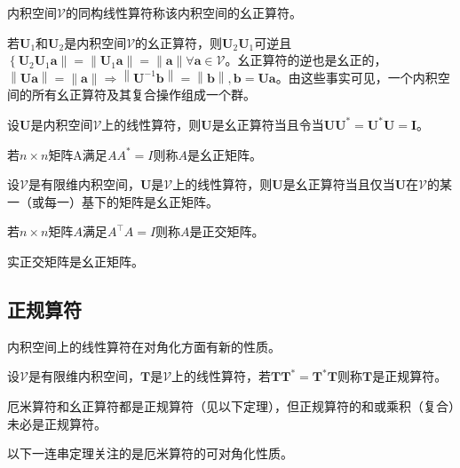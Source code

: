 \documentclass[main.tex]{subfiles}
\begin{document}
\begin{definition}[幺正算符]
内积空间$\mathcal{V}$的同构线性算符称该内积空间的幺正算符。
\end{definition}

若$\mathbf{U}_1$和$\mathbf{U}_2$是内积空间$\mathcal{V}$的幺正算符，则$\mathbf{U}_2\mathbf{U}_1$可逆且$\left\{\mathbf{U}_2\mathbf{U}_1\mathbf{a}\right\|=\left\|\mathbf{U}_1\mathbf{a}\right\|=\left\|\mathbf{a}\right\|\forall\mathbf{a}\in\mathcal{V}$。幺正算符的逆也是幺正的，$\left\|\mathbf{Ua}\right\|=\left\|\mathbf{a}\right\|\Rightarrow\left\|\mathbf{U}^{-1}\mathbf{b}\right\|=\left\|\mathbf{b}\right\|,\mathbf{b}=\mathbf{Ua}$。由这些事实可见，一个内积空间的所有幺正算符及其复合操作组成一个群。

\begin{theorem}
设$\mathbf{U}$是内积空间$\mathcal{V}$上的线性算符，则$\mathbf{U}$是幺正算符当且令当$\mathbf{UU}^*=\mathbf{U}^*\mathbf{U}=\mathbf{I}$。
\end{theorem}

\begin{definition}[幺正矩阵]
若$n\times n$矩阵A满足$AA^*=I$则称$A$是幺正矩阵。
\end{definition}

\begin{theorem}
设$\mathcal{V}$是有限维内积空间，$\mathbf{U}$是$\mathcal{V}$上的线性算符，则$\mathbf{U}$是幺正算符当且仅当$\mathbf{U}$在$\mathcal{V}$的某一（或每一）基下的矩阵是幺正矩阵。
\end{theorem}

\begin{definition}[正交矩阵]
若$n\times n$矩阵$A$满足$A^\intercal A=I$则称$A$是正交矩阵。
\end{definition}

实正交矩阵是幺正矩阵。

\subsection{正规算符}
内积空间上的线性算符在对角化方面有新的性质。

\begin{definition}[正规算符]
设$\mathcal{V}$是有限维内积空间，$\mathbf{T}$是$\mathcal{V}$上的线性算符，若$\mathbf{TT}^*=\mathbf{T}^*\mathbf{T}$则称$\mathbf{T}$是正规算符。
\end{definition}

厄米算符和幺正算符都是正规算符（见以下定理），但正规算符的和或乘积（复合）未必是正规算符。

以下一连串定理关注的是厄米算符的可对角化性质。
\end{document}
